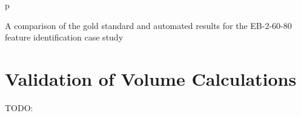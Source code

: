 \begin{stusubfig}{p}
	\hspace{4mm}%
\caption{A comparison of the gold standard and automated results for the EB-2-60-80 feature identification case study}
\label{fig:validation-EB-2-60-80}
\end{stusubfig}

\afterpage{\clearpage}
\newpage

\section{Validation of Volume Calculations}

TODO: \cite{woodard86}

